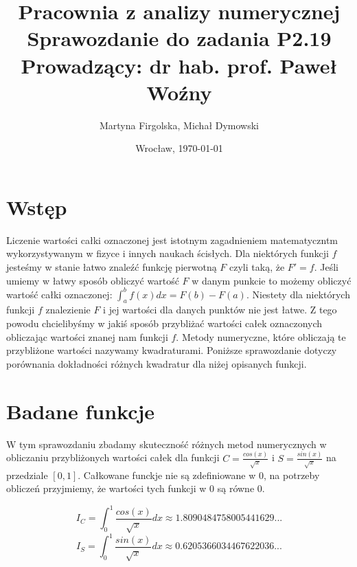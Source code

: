 \documentclass{article}
\title{
	\textbf{Pracownia z analizy numerycznej}\\[8pt]
	\large{Sprawozdanie do zadania \textbf{P2.19}\\
	Prowadzący: dr hab. prof. Paweł Woźny}}
\author{\large{Martyna Firgolska, Michał Dymowski}}
\date{\large{Wrocław, \today}}
\begin{document}
\maketitle 

\section*{Wstęp}
Liczenie wartości całki oznaczonej jest istotnym zagadnieniem matematyczntm wykorzystywanym w fizyce i innych naukach ścisłych. Dla niektórych funkcji $f$ jesteśmy w stanie łatwo znaleźć funkcję pierwotną $F$ czyli taką, że $F' = f$. Jeśli umiemy w łatwy sposób obliczyć wartość $F$ w danym punkcie to możemy obliczyć wartość całki oznaczonej: $\int_a^b f(x) dx = F(b) - F(a) $. Niestety dla niektórych funkcji $f$ znalezienie $F$ i jej wartości dla danych punktów nie jest łatwe. Z tego powodu chcielibyśmy w jakiś sposób przybliżać wartości całek oznaczonych obliczając wartości znanej nam funkcji $f$. Metody numeryczne, które obliczają te przybliżone wartości nazywamy kwadraturami. Poniższe sprawozdanie dotyczy porównania dokładności różnych kwadratur dla niżej opisanych funkcji.
\section*{Badane funkcje}
W tym sprawozdaniu zbadamy skuteczność różnych metod numerycznych w obliczaniu przybliżonych wartości całek dla funkcji $C = \frac{cos(x)}{\sqrt{x}}$ i $S = \frac{sin(x)}{\sqrt{x}}$ na przedziale $[0, 1]$. Całkowane funckje nie są zdefiniowane w $0$, na potrzeby obliczeń przyjmiemy, że wartości tych funkcji w $0$ są równe $0$. 

\begin{equation}
I_C = \int_0^1 \frac{cos(x)}{\sqrt{x}} dx \approx 1.8090484758005441629...
\end{equation}
\begin{equation}
I_S = \int_0^1 \frac{sin(x)}{\sqrt{x}} dx \approx 0.6205366034467622036...
\end{equation}
\end{document}
